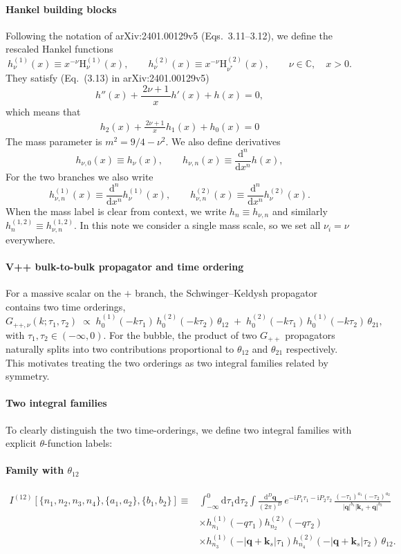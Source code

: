 \documentclass[a4paper]{article}
\newcommand{\FR}[2]{\displaystyle\frac{\,{#1}\,}{#2}}
\def\bge{\begin{equation}}
\def\ede{\end{equation}}
\def\ie{\begin{equation}\begin{aligned}}
\def\fe{\end{aligned}\end{equation}}
\def\di{{\mathrm{d}}}
\def\mb{\mathbf}
\def\ii{\mathrm{i}}
\begin{document}
\paragraph{Hankel building blocks} Following the notation of arXiv:2401.00129v5 (Eqs.~3.11--3.12), we define the rescaled Hankel functions
\bge
h_\nu^{(1)}(x) \equiv x^{-\nu}\mathrm H_{
\nu}^{(1)}(x),\qquad h_\nu^{(2)}(x) \equiv x^{-\nu}\mathrm H_{
\nu^*}^{(2)}(x),\qquad 
\nu\in\mathbb C,\quad x>0.
\ede
They satisfy (Eq.~(3.13) in arXiv:2401.00129v5)
\begin{equation}
	h''(x) + \FR{2\nu+1}{x}h'(x) + h(x) = 0, \label{eq:hdef}
\end{equation}
which means that
\ie
h_2(x)+\FR{2\nu+1}{x}h_1(x)+h_0(x)=0
\fe
The mass parameter is $m^2=9/4-\nu^2$. We also define derivatives
\bge
h_{\nu,0}(x)\equiv h_\nu(x),\qquad h_{\nu,n} (x)  \equiv  \FR{\di^n}{\di x^n}h(x),
\ede
For the two branches we also write
\bge
h^{(1)}_{\nu,n}(x)\equiv \FR{\di^n}{\di x^n}h^{(1)}_\nu(x),\qquad
h^{(2)}_{\nu,n}(x)\equiv \FR{\di^n}{\di x^n}h^{(2)}_\nu(x).
\ede
When the mass label is clear from context, we write $h_n\equiv h_{\nu,n}$ and similarly $h^{(1,2)}_n\equiv h^{(1,2)}_{\nu,n}$.
In this note we consider a single mass scale, so we set all $\nu_i=\nu$ everywhere.

\paragraph{V++ bulk-to-bulk propagator and time ordering} For a massive scalar on the $+$ branch, the Schwinger--Keldysh propagator contains two time orderings,
\bge
G_{++,\nu}(k;\tau_1,\tau_2)\;\propto\;
h_0^{(1)}(-k\tau_1)\,h_0^{(2)}(-k\tau_2)\,\theta_{12}
\;+\;
h_0^{(2)}(-k\tau_1)\,h_0^{(1)}(-k\tau_2)\,\theta_{21},
\ede
with $\tau_1,\tau_2\in(-\infty,0)$. For the bubble, the product of two $G_{++}$ propagators naturally splits into two contributions proportional to $\theta_{12}$ and $\theta_{21}$ respectively. This motivates treating the two orderings as two integral families related by symmetry.

\paragraph{Two integral families} To clearly distinguish the two time-orderings, we define two integral families with explicit $\theta$-function labels:

\paragraph{Family with $\theta_{12}$}
\begin{align}
	I^{(12)}[\{n_1,n_2,n_3,n_4\},\{a_1,a_2\},\{b_1,b_2\}] \equiv & \int_{-\infty}^0 \di\tau_1\di\tau_2 \int \FR{\di^D \mb q}{(2\pi)^D}\, e^{-\ii P_1\tau_1 - \ii P_2 \tau_2}\,
	\frac{(-\tau_1)^{a_1}(-\tau_2)^{a_2}}{|\mb q|^{b_1}|\mb k_s+\mb q|^{b_2}} \nonumber \\
	& \times h_{n_1}^{(1)}(-q\tau_1)h_{n_2}^{(2)}(-q\tau_2)\nonumber\\
	& \times h_{n_3}^{(1)}(-|\mb q+\mb k_s|\tau_1)h_{n_4}^{(2)}(-|\mb q+\mb k_s|\tau_2)\,\theta_{12}.
\end{align}
\end{document}
